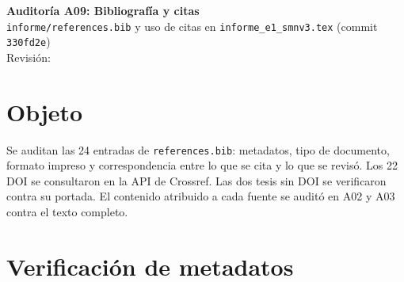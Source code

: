 \newcommand{\auditoriaid}{A09 -- Bibliografía y citas}



\begin{center}
{\Large\bfseries Auditoría A09: Bibliografía y citas}\\[0.4em]
{\normalsize \texttt{informe/references.bib} y uso de citas en \texttt{informe\_e1\_smnv3.tex} (commit \texttt{330fd2e})}\\[0.2em]
{\small Revisión: \fechaentrega}
\end{center}

\section{Objeto}

Se auditan las 24 entradas de \texttt{references.bib}: metadatos, tipo de documento, formato impreso y correspondencia entre lo que se cita y lo que se revisó. Los 22 DOI se consultaron en la API de Crossref. Las dos tesis sin DOI se verificaron contra su portada. El contenido atribuido a cada fuente se auditó en A02 y A03 contra el texto completo.

\section{Verificación de metadatos}

